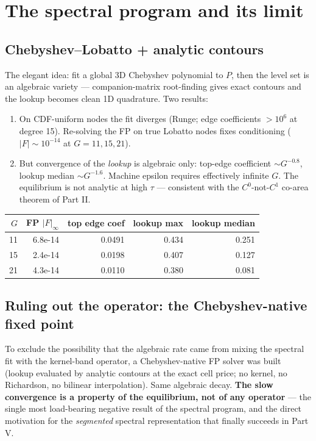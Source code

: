 \chapter{The spectral program and its limit}

\section{Chebyshev--Lobatto + analytic contours}
The elegant idea: fit a global 3D Chebyshev polynomial to $P$, then the
level set is an algebraic variety --- companion-matrix root-finding gives
exact contours and the lookup becomes clean 1D quadrature. Two results:
\begin{enumerate}\itemsep2pt
  \item On CDF-uniform nodes the fit diverges (Runge; edge coefficients
        $> 10^6$ at degree 15). Re-solving the FP on true Lobatto nodes
        fixes conditioning ($|F| \sim 10^{-14}$ at $G = 11, 15, 21$).
  \item But convergence of the \emph{lookup} is algebraic only:
        top-edge coefficient $\sim G^{-0.8}$, lookup median
        $\sim G^{-1.6}$. Machine epsilon requires effectively infinite
        $G$. The equilibrium is not analytic at high $\tau$ ---
        consistent with the $C^0$-not-$C^1$ co-area theorem of Part II.
\end{enumerate}

\begin{center}\begin{tabular}{rrrrr}\toprule
$G$ & FP $|F|_\infty$ & top edge coef & lookup max & lookup median \\
\midrule
11 & 6.8e-14 & 0.0491 & 0.434 & 0.251 \\
15 & 2.4e-14 & 0.0198 & 0.407 & 0.127 \\
21 & 4.3e-14 & 0.0110 & 0.380 & 0.081 \\
\bottomrule\end{tabular}\end{center}

\section{Ruling out the operator: the Chebyshev-native fixed point}
To exclude the possibility that the algebraic rate came from mixing the
spectral fit with the kernel-band operator, a Chebyshev-native FP solver
was built (lookup evaluated by analytic contours at the exact cell
price; no kernel, no Richardson, no bilinear interpolation). Same
algebraic decay. \textbf{The slow convergence is a property of the
equilibrium, not of any operator} --- the single most load-bearing
negative result of the spectral program, and the direct motivation for
the \emph{segmented} spectral representation that finally succeeds in
Part V.
